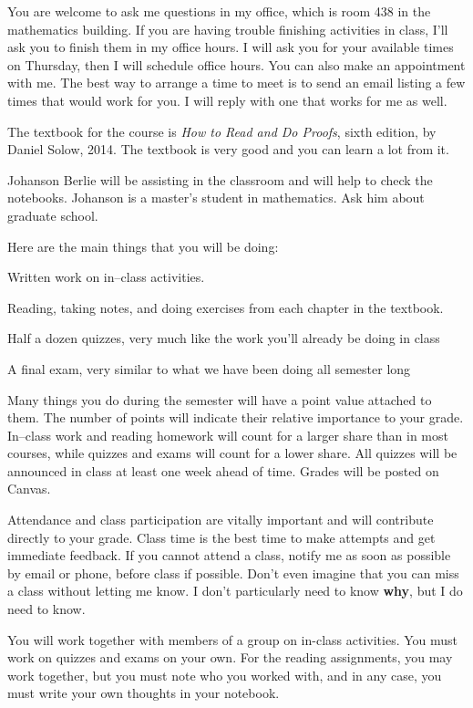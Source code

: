 You are welcome to ask me questions in my office, which is room 438 in the mathematics building.
If you are having trouble finishing activities in class, I'll ask you to finish them in my office hours.
I will ask you for your available times on Thursday, then I will schedule office hours.
You can also make an appointment with me.
The best way to arrange a time to meet is to send an email listing a few times that would work for you.
I will reply with one that works for me as well.

The textbook for the course is {\em How to Read and Do Proofs}, sixth edition, by Daniel Solow, 2014.  
The textbook is very good and you can learn a lot from it.

 Johanson Berlie will be assisting in the classroom and will help to check the notebooks.
Johanson is a master's student in mathematics.
Ask him about graduate school.

 Here are the main things that you will be doing:
\blist{0.0in}
\item Written work on in--class activities.
\item Reading, taking notes, and doing exercises from each chapter in the textbook.
\item Half a dozen quizzes, very much like the work you'll already be doing in class
\item A final exam, very similar to what we have been doing all semester long
\elist

  Many things you do during the semester will have a point value attached to them.  
The number of points will indicate their relative importance to your grade.  
In--class work and reading homework will count for a larger share than in most courses, while quizzes and exams will count for a lower share.
All quizzes will be announced in class at least one week ahead of time.
Grades will be posted on Canvas.

 Attendance and class participation are vitally important and will contribute directly to your grade.
Class time is the best time to make attempts and get immediate feedback.
If you cannot attend a class, notify me as soon as possible by email or phone, before class if possible.
Don't even imagine that you can miss a class without letting me know.
I don't particularly need to know {\bf why}, but I do need to know.

 You will work together with members of a group on in-class activities.  You must work on quizzes and exams on your own.  For the reading assignments, you may work together, but you must note who you worked with, and in any case, you must write your own thoughts in your notebook.
\vfill          %
